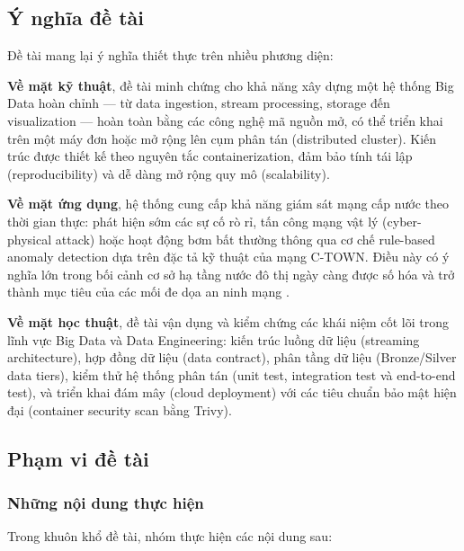 \subsection{Ý nghĩa đề tài}

Đề tài mang lại ý nghĩa thiết thực trên nhiều phương diện:

\textbf{Về mặt kỹ thuật}, đề tài minh chứng cho khả năng xây dựng một hệ thống Big
Data hoàn chỉnh --- từ data ingestion, stream processing, storage đến visualization
--- hoàn toàn bằng các công nghệ mã nguồn mở, có thể triển khai trên một máy đơn
hoặc mở rộng lên cụm phân tán (distributed cluster). Kiến trúc được thiết kế theo
nguyên tắc containerization, đảm bảo tính tái lập (reproducibility) và dễ dàng mở
rộng quy mô (scalability).

\textbf{Về mặt ứng dụng}, hệ thống cung cấp khả năng giám sát mạng cấp nước theo
thời gian thực: phát hiện sớm các sự cố rò rỉ, tấn công mạng vật lý
(cyber-physical attack) hoặc hoạt động bơm bất thường thông qua cơ chế rule-based
anomaly detection dựa trên đặc tả kỹ thuật của mạng C-TOWN. Điều này có ý nghĩa
lớn trong bối cảnh cơ sở hạ tầng nước đô thị ngày càng được số hóa và trở thành
mục tiêu của các mối đe dọa an ninh mạng \cite{taormina2018batadal}.

\textbf{Về mặt học thuật}, đề tài vận dụng và kiểm chứng các khái niệm cốt lõi
trong lĩnh vực Big Data và Data Engineering: kiến trúc luồng dữ liệu (streaming
architecture), hợp đồng dữ liệu (data contract), phân tầng dữ liệu (Bronze/Silver
data tiers), kiểm thử hệ thống phân tán (unit test, integration test và end-to-end
test), và triển khai đám mây (cloud deployment) với các tiêu chuẩn bảo mật hiện đại
(container security scan bằng Trivy).

\subsection{Phạm vi đề tài}

\subsubsection{Những nội dung thực hiện}

Trong khuôn khổ đề tài, nhóm thực hiện các nội dung sau:

